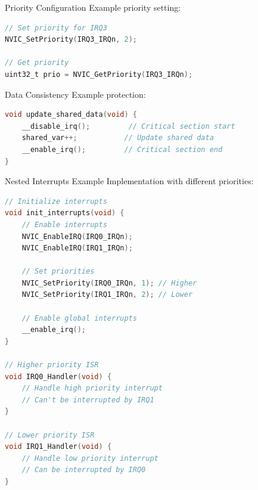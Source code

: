 \begin{example2}{Priority Configuration}
  Example priority setting:
\begin{lstlisting}[language=C, style=basesmol]
// Set priority for IRQ3
NVIC_SetPriority(IRQ3_IRQn, 2);

// Get priority
uint32_t prio = NVIC_GetPriority(IRQ3_IRQn);
\end{lstlisting}
  
\end{example2}

\begin{example2}{Data Consistency}
  Example protection:
\begin{lstlisting}[language=C, style=basesmol]
void update_shared_data(void) {
    __disable_irq();         // Critical section start
    shared_var++;           // Update shared data
    __enable_irq();         // Critical section end
}
\end{lstlisting}
\end{example2}

\begin{example2}{Nested Interrupts Example}
Implementation with different priorities:
\begin{lstlisting}[language=C, style=basesmol]
// Initialize interrupts
void init_interrupts(void) {
    // Enable interrupts
    NVIC_EnableIRQ(IRQ0_IRQn);
    NVIC_EnableIRQ(IRQ1_IRQn);
    
    // Set priorities
    NVIC_SetPriority(IRQ0_IRQn, 1); // Higher
    NVIC_SetPriority(IRQ1_IRQn, 2); // Lower
    
    // Enable global interrupts
    __enable_irq();
}

// Higher priority ISR
void IRQ0_Handler(void) {
    // Handle high priority interrupt
    // Can't be interrupted by IRQ1
}

// Lower priority ISR
void IRQ1_Handler(void) {
    // Handle low priority interrupt
    // Can be interrupted by IRQ0
}
\end{lstlisting}
\end{example2}









